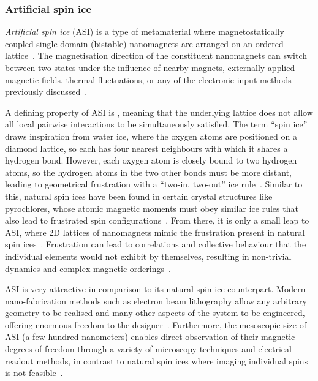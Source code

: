 \subsubsection{Artificial spin ice}\label{sec:1:ASI}
\textit{Artificial spin ice} (ASI) is a type of metamaterial where magnetostatically coupled single-domain (bistable) nanomagnets are arranged on an ordered lattice~\cite{RC_ASI,flatspin}.
The magnetisation direction of the constituent nanomagnets can switch between two states under the influence of nearby magnets, externally applied magnetic fields, thermal fluctuations, or any of the electronic input methods previously discussed~\cite{CoerciveFieldReversal,BrownThermalFluctuations,SOT_FM_AFM,brataas2012current}. \par
A defining property of ASI is , meaning that the underlying lattice does not allow all local pairwise interactions to be simultaneously satisfied.
The term ``spin ice'' draws inspiration from water ice, where the oxygen atoms are positioned on a diamond lattice, so each has four nearest neighbours with which it shares a hydrogen bond. %
However, each oxygen atom is closely bound to two hydrogen atoms, so the hydrogen atoms in the two other bonds must be more distant, leading to geometrical frustration with a ``two-in, two-out'' ice rule~\cite{nisoli2013colloquium,ZeroPointEntropy,heyderman2013artificial,MagnetizationDynamicsASI}.
Similar to this, natural spin ices have been found in certain crystal structures like pyrochlores, whose atomic magnetic moments must obey similar ice rules that also lead to frustrated spin configurations~\cite{nisoli2013colloquium}.
From there, it is only a small leap to ASI, where 2D lattices of nanomagnets mimic the frustration present in natural spin ices~\cite{heyderman2013artificial}.
Frustration can lead to correlations and collective behaviour that the individual elements would not exhibit by themselves, resulting in non-trivial dynamics and complex magnetic orderings~\cite{AdvancesASI,ASI_computation,ApparentFMpinwheel}. \par
ASI is very attractive in comparison to its natural spin ice counterpart.
Modern nano-fabrication methods such as electron beam lithography allow any arbitrary geometry to be realised and many other aspects of the system to be engineered, offering enormous freedom to the designer~\cite{AdvancesASI,ASI_computation}.
Furthermore, the mesoscopic size of ASI (a few hundred nanometers) enables direct observation of their magnetic degrees of freedom through a variety of microscopy techniques and electrical readout methods, in contrast to natural spin ices where imaging individual spins is not feasible~\cite{nisoli2013colloquium,freeman2001advances}.
